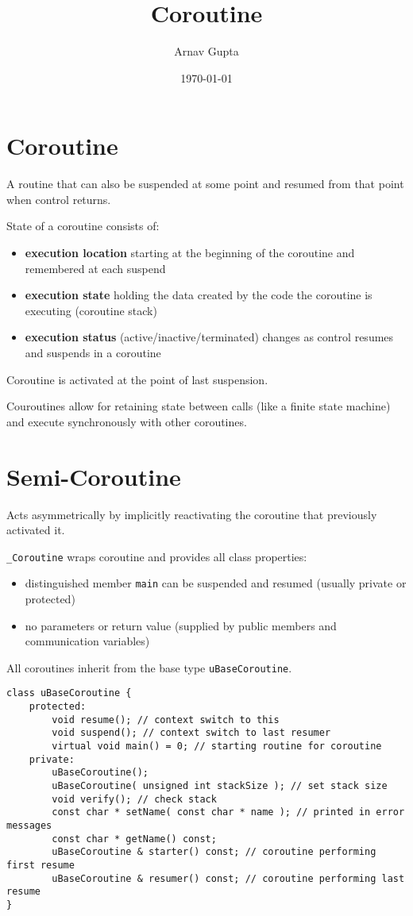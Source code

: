 \documentclass[11pt]{article}
\author{Arnav Gupta}
\date{\today}
\title{Coroutine}
\begin{document}
\maketitle
\tableofcontents

\section{Coroutine}
\label{sec:org9fa8f76}
A routine that can also be suspended at some point and resumed from that point when control returns.

State of a coroutine consists of:
\begin{itemize}
\item \textbf{execution location} starting at the beginning of the coroutine and remembered at each suspend
\item \textbf{execution state} holding the data created by the code the coroutine is executing (coroutine stack)
\item \textbf{execution status} (active/inactive/terminated) changes as control resumes and suspends in a coroutine
\end{itemize}

Coroutine is activated at the point of last suspension.

Couroutines allow for retaining state between calls (like a finite state machine) and execute
synchronously with other coroutines.
\section{Semi-Coroutine}
\label{sec:orgc1d8182}
Acts asymmetrically by implicitly reactivating the coroutine that previously activated it.

\texttt{\_Coroutine} wraps coroutine and provides all class properties:
\begin{itemize}
\item distinguished member \texttt{main} can be suspended and resumed (usually private or protected)
\item no parameters or return value (supplied by public members and communication variables)
\end{itemize}

All coroutines inherit from the base type \texttt{uBaseCoroutine}.
\begin{verbatim}
class uBaseCoroutine {
    protected:
        void resume(); // context switch to this
        void suspend(); // context switch to last resumer
        virtual void main() = 0; // starting routine for coroutine
    private:
        uBaseCoroutine();
        uBaseCoroutine( unsigned int stackSize ); // set stack size
        void verify(); // check stack
        const char * setName( const char * name ); // printed in error messages
        const char * getName() const;
        uBaseCoroutine & starter() const; // coroutine performing first resume
        uBaseCoroutine & resumer() const; // coroutine performing last resume
}
\end{verbatim}
\end{document}
